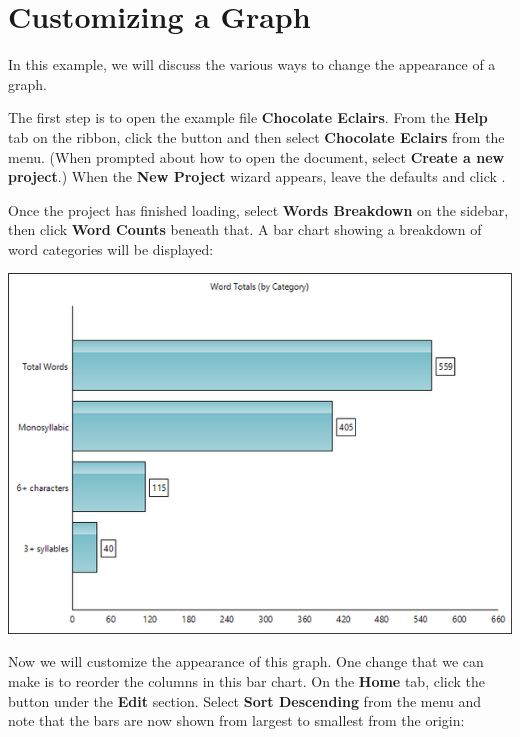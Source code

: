 \documentclass[
]{book}
\theoremstyle{definition}
\theoremstyle{definition}
\theoremstyle{definition}
\theoremstyle{definition}
\theoremstyle{remark}
\begin{document}
\hypertarget{customizing-a-graph}{%
\section{Customizing a Graph}\label{customizing-a-graph}}

In this example, we will discuss the various ways to change the appearance of a graph.

The first step is to open the example file \textbf{Chocolate Eclairs}. From the \textbf{Help} tab on the ribbon, click the  button and then select \textbf{Chocolate Eclairs} from the menu. (When prompted about how to open the document, select \textbf{Create a new project}.) When the \textbf{New Project} wizard appears, leave the defaults and click .

Once the project has finished loading, select \textbf{Words Breakdown} on the sidebar, then click \textbf{Word Counts} beneath that. A bar chart showing a breakdown of word categories will be displayed:

\includegraphics{Images/ExampleGraphDefault.png}

Now we will customize the appearance of this graph. One change that we can make is to reorder the columns in this bar chart. On the \textbf{Home} tab, click the  button under the \textbf{Edit} section. Select \textbf{Sort Descending} from the menu and note that the bars are now shown from largest to smallest from the origin:
\end{document}
